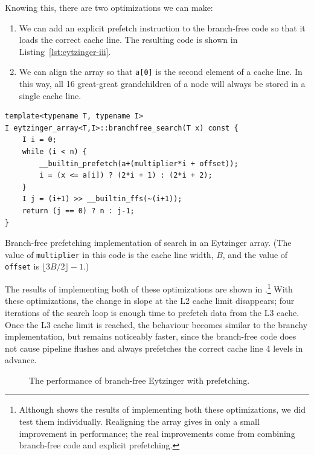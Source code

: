 \documentclass{patmorin}
\newcommand{\lstlabel}[1]{\label{lst:#1}}
\newcommand{\lstref}[1]{Listing~\ref{lst:#1}}
\begin{document}
Knowing this, there are two optimizations we can make:
\begin{enumerate}
  \item We can add an explicit prefetch instruction to the branch-free code
    so that it loads the correct cache line.  The resulting code is shown
    in \lstref{eytzinger-iii}.

  \item We can align the array so that \texttt{a[0]} is the
    second element of a cache line.  In this way, all 16 great-great
    grandchildren of a node will always be stored in a single cache line.
\end{enumerate}

\begin{listing}
\begin{verbatim}
template<typename T, typename I>
I eytzinger_array<T,I>::branchfree_search(T x) const {
    I i = 0;
    while (i < n) {
        __builtin_prefetch(a+(multiplier*i + offset));
        i = (x <= a[i]) ? (2*i + 1) : (2*i + 2);
    }
    I j = (i+1) >> __builtin_ffs(~(i+1));
    return (j == 0) ? n : j-1;
}
\end{verbatim}
\caption{Branch-free prefetching implementation of search in an
         Eytzinger array. (The value of \texttt{multiplier}
         in this code is the cache line width, $B$, and the value of
         \texttt{offset} is $\lfloor3B/2\rfloor-1$.)}
\lstlabel{eytzinger-iii}
\end{listing}

The results of implementing both of these optimizations are shown
in .\footnote{Although 
shows the results of implementing both these optimizations, we did test them
individually. Realigning the array gives in only a small improvement in
performance; the real improvements come from combining branch-free code and
explicit prefetching.}  With these optimizations, the change in slope
at the L2 cache limit disappears; four iterations of the search loop is
enough time to prefetch data from the L3 cache.  Once the L3 cache limit
is reached, the behaviour becomes similar to the branchy implementation,
but remains noticeably faster, since the branch-free code does not cause
pipeline flushes and always prefetches the correct cache line 4 levels
in advance.

\begin{figure}
   \caption{The performance of branch-free Eytzinger with prefetching.}
\end{figure}
\end{document}
